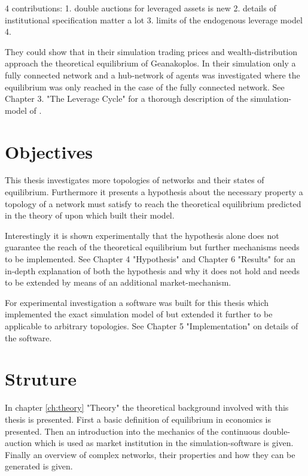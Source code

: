 \documentclass[Bachelorarbeit.tex]{subfiles}
\begin{document}
4 contributions:
1. double auctions for leveraged assets is new
2. details of institutional specification matter a lot
3. limits of the endogenous leverage model
4. 

They could show that in their simulation trading prices and wealth-distribution approach the theoretical equilibrium of Geanakoplos.
In their simulation only a fully connected network and a hub-network of agents was investigated where the equilibrium was only reached in the case of the fully connected network. See Chapter 3. "The Leverage Cycle" for a thorough description of the simulation-model of \cite{Breuer2015}. 

\section{Objectives}
This thesis investigates more topologies of networks and their states of equilibrium. Furthermore it presents a hypothesis about the necessary property a topology of a network must satisfy to reach the theoretical equilibrium predicted in the theory of \cite{Geanakoplos2009} upon which \cite{Breuer2015} built their model.

Interestingly it is shown experimentally that the hypothesis alone does not guarantee
the reach of the theoretical equilibrium but further mechanisms needs to be implemented.
See Chapter 4 "Hypothesis" and Chapter 6 "Results" for an in-depth explanation of both the hypothesis and why it does not hold and needs to be extended by means of an additional market-mechanism.

\thinspace

For experimental investigation a software was built for this thesis which 
implemented the exact simulation model of \cite{Breuer2015} but extended it further to be 
applicable to arbitrary topologies. See Chapter 5 "Implementation" on details of the software.

\section{Struture}
In chapter \ref{ch:theory} "Theory" the theoretical background involved with this thesis is presented. First a basic definition of equilibrium in economics is presented. Then an introduction into the mechanics of the continuous double-auction which is used as market institution in the simulation-software is given. Finally an overview of complex networks, their properties and how they can be generated is given.
\end{document}
